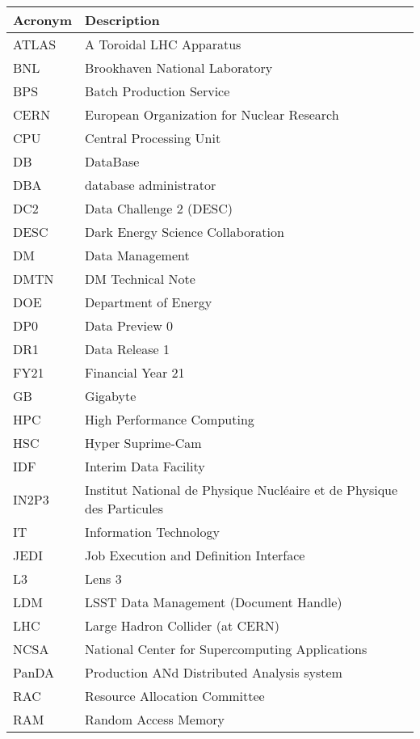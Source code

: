 \addtocounter{table}{-1}
\begin{longtable}{p{}p{}}\hline
\textbf{Acronym} & \textbf{Description}  \\\hline

ATLAS & A Toroidal LHC Apparatus \\\hline
BNL & Brookhaven National Laboratory \\\hline
BPS & Batch Production Service \\\hline
CERN & European Organization for Nuclear Research \\\hline
CPU & Central Processing Unit \\\hline
DB & DataBase \\\hline
DBA & database administrator \\\hline
DC2 & Data Challenge 2 (DESC) \\\hline
DESC & Dark Energy Science Collaboration \\\hline
DM & Data Management \\\hline
DMTN & DM Technical Note \\\hline
DOE & Department of Energy \\\hline
DP0 & Data Preview 0 \\\hline
DR1 & Data Release 1 \\\hline
FY21 & Financial Year 21 \\\hline
GB & Gigabyte \\\hline
HPC & High Performance Computing \\\hline
HSC & Hyper Suprime-Cam \\\hline
IDF & Interim Data Facility \\\hline
IN2P3 & Institut National de Physique Nucléaire et de Physique des Particules \\\hline
IT & Information Technology \\\hline
JEDI & Job Execution and Definition Interface \\\hline
L3 & Lens 3 \\\hline
LDM & LSST Data Management (Document Handle) \\\hline
LHC & Large Hadron Collider (at CERN) \\\hline
NCSA & National Center for Supercomputing Applications \\\hline
PanDA &  Production ANd Distributed Analysis system \\\hline
RAC & Resource Allocation Committee \\\hline
RAM & Random Access Memory \\\hline

\end{longtable}
